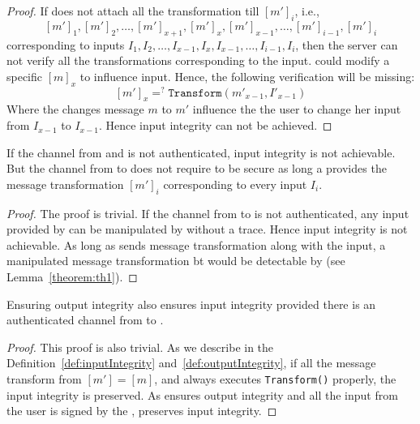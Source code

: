 \begin{proof}
If \user does not attach all the transformation till $[m']_i$, i.e., $$[m']_1, [m']_2, \ldots, [m']_{x+1}, [m']_x, [m']_{x-1}, \ldots, [m']_{i-1}, [m']_i$$  corresponding to inputs $I_1, I_2,\ldots, I_{x-1}, I_x, I_{x-1}, \ldots, I_{i-1}, I_i$, then the server can not verify all the transformations corresponding to the input. \host could modify a specific $[m]_x$ to influence \user input. Hence, the following verification will be missing:
$$[m']_x=^?\texttt{Transform}({m'}_{x-1}, I'_{x-1})$$
Where the \host changes message $m$ to $m'$ influence the the user to change her input from $I_{x-1}$ to $I_{x-1}$. Hence input integrity can not be achieved.
\end{proof}

\begin{lemma}
\label{theorem:th2}
If the channel from \user and \server is not authenticated, input integrity is not achievable. But the channel from \server to \user does not require to be secure as long a \user provides the message transformation $[m']_i$ corresponding to every input $I_i$.
\end{lemma}

\begin{proof}
The proof is trivial. If the channel from \user to \server is not authenticated, any input provided by \user can be manipulated by \host without a trace. Hence input integrity is not achievable. As long as \user sends message transformation along with the input, a manipulated message transformation bt \host would be detectable by \server (see Lemma~\ref{theorem:th1}).
\end{proof}

\begin{lemma}
\label{theorem:th3}
Ensuring output integrity also ensures input integrity provided there is an authenticated channel from \user to \server.
\end{lemma}

\begin{proof}
This proof is also trivial. As we describe in the Definition~\ref{def:inputIntegrity} and~\ref{def:outputIntegrity}, if all the message transform from \host $[m']=[m]$, and \host always executes \texttt{Transform()} properly, the input integrity is preserved. As \name ensures output integrity and all the input from the user is signed by the \device, \name preserves input integrity. 
\end{proof}


